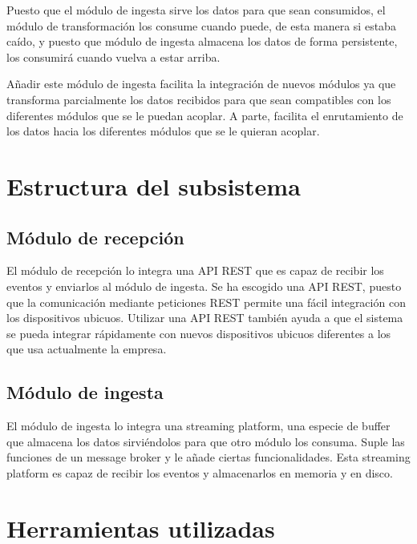 
Puesto que el módulo de ingesta sirve los datos para que sean consumidos, el módulo de transformación los consume cuando puede, de esta manera si estaba caído, y puesto que módulo de ingesta almacena los datos de forma persistente, los consumirá cuando vuelva a estar arriba.

Añadir este módulo de ingesta facilita la integración de nuevos módulos ya que transforma parcialmente los datos recibidos para que sean compatibles con los diferentes módulos que se le puedan acoplar. A parte, facilita el enrutamiento de los datos hacia los diferentes módulos que se le quieran acoplar. 



\section{Estructura del subsistema}

\subsection{Módulo de recepción}
El módulo de recepción lo integra una API REST que es capaz de recibir los eventos y enviarlos al módulo de ingesta. Se ha escogido una API REST, puesto que la comunicación mediante peticiones REST permite una fácil integración con los dispositivos ubicuos. Utilizar una API REST también ayuda a que el sistema se pueda integrar rápidamente con nuevos dispositivos ubicuos diferentes a los que usa actualmente la empresa.

\subsection{Módulo de ingesta}
El módulo de ingesta lo integra una streaming platform, una especie de buffer que almacena los datos sirviéndolos para que otro módulo los consuma. Suple las funciones de un message broker\cite{Tfg:messagebroker} y le añade ciertas funcionalidades. Esta streaming platform es capaz de recibir los eventos y almacenarlos en memoria y en disco.


\section{Herramientas utilizadas}

